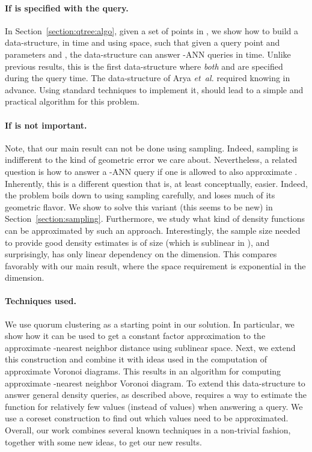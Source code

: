 \documentclass[12pt]{article}
\makeatletter
\newcommand{\Term}[1]{\textsf{#1}}
\newcommand{\TermI}[1]{\Term{#1}\index{#1@\Term{#1}}}
\theoremstyle{remark}{\theorembodyfont{\rm} \newtheorem{remark}[theorem]{Remark}}
\newcommand{\secref}[1]{Section~\ref{section:#1}}
\newcommand{\ANN}{\TermI{ANN}\xspace}
\newcommand{\etal}{\textit{et~al.}\xspace}
\makeatother
\begin{document}
\paragraph{If  is specified with the query.}
In \secref{qtree:algo}, given a set  of  points in
, we show how to build a data-structure, in  time
and using  space, such that given a query point and parameters
 and , the data-structure can answer -\ANN 
queries in 
time. Unlike previous results, this is the first data-structure where
\emph{both}  and  are specified during the query
time. The data-structure of Arya \etal \cite{amm-sttas-05}
required knowing  in advance. Using standard techniques
\cite{amnsw-oaann-98} to implement it, should lead to a simple and
practical algorithm for this problem.



\paragraph{If  is not important.}
Note, that our main result can not be done using sampling. Indeed,
sampling is indifferent to the kind of geometric error we care
about. Nevertheless, a related question is how to answer a
-\ANN query if one is allowed to also approximate .
Inherently, this is a different question that is, at least
conceptually, easier. Indeed, the problem boils down to using sampling
carefully, and loses much of its geometric flavor. We show to solve
this variant (this seems to be new) in \secref{sampling}. Furthermore,
we study what kind of density functions can be approximated by such an
approach. Interestingly, the sample size needed to provide good
density estimates is of size  (which is sublinear in
), and surprisingly, has only linear dependency on the
dimension. This compares favorably with our main result, where the
space requirement is exponential in the dimension.


\paragraph{Techniques used.}
We use quorum clustering as a starting point in our solution. In
particular, we show how it can be used to get a constant
factor approximation to the approximate -nearest neighbor distance
using sublinear space.  Next, we extend this construction and combine
it with ideas used in the computation of approximate Voronoi
diagrams. This results in an algorithm for computing approximate
-nearest neighbor Voronoi diagram.  To extend this data-structure
to answer general density queries, as described above, requires a
way to estimate the function  for relatively few values
(instead of  values) when answering a query. We use a coreset
construction to find out which values need to be approximated.
Overall, our work combines several known techniques in a non-trivial
fashion, together with some new ideas, to get our new results.
\end{document}
